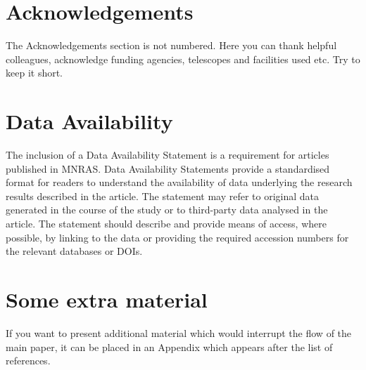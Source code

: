 \documentclass[fleqn,usenatbib]{mnras}
\begin{document}
\section*{Acknowledgements}

The Acknowledgements section is not numbered. Here you can thank helpful
colleagues, acknowledge funding agencies, telescopes and facilities used etc.
Try to keep it short.

\section*{Data Availability}


The inclusion of a Data Availability Statement is a requirement for articles
published in MNRAS. Data Availability Statements provide a standardised format
for readers to understand the availability of data underlying the research
results described in the article. The statement may refer to original data
generated in the course of the study or to third-party data analysed in the
article. The statement should describe and provide means of access, where
possible, by linking to the data or providing the required accession numbers for
the relevant databases or DOIs.













\appendix

\section{Some extra material}

If you want to present additional material which would interrupt the flow of the main paper,
it can be placed in an Appendix which appears after the list of references.



\bsp	%
\label{lastpage}
\end{document}
